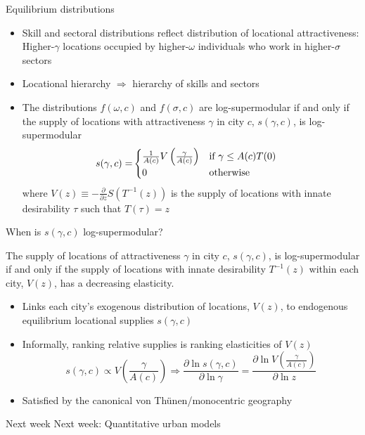\documentclass[11pt,notes=hide,aspectratio=169]{beamer}
\begin{document}
\begin{frame}{Equilibrium distributions}
\begin{itemize}
\item Skill and sectoral distributions reflect distribution of locational
attractiveness: Higher-$\gamma$ locations occupied by higher-$\omega$
individuals who work in higher-$\sigma$ sectors
\item Locational hierarchy $\Rightarrow$ hierarchy of skills and sectors
\item The distributions $f(\omega,c)$ and $f(\sigma,c)$ are log-supermodular
if and only if the supply of locations with attractiveness $\gamma$
in city $c$, $s(\gamma,c)$, is log-supermodular 
\begin{align*}
s(\gamma,c)= & \begin{cases}
\frac{1}{A(c)}V\left(\frac{\gamma}{A(c)}\right) & \textnormal{if }\gamma\leq A(c)T(0)\\
0 & \textnormal{otherwise}
\end{cases}
\end{align*}
where\textrm{ $V(z)\equiv-\frac{\partial}{\partial z}S\left(T^{-1}(z)\right)$
is }the supply of locations with innate desirability $\tau$ such
that $T(\tau)=z$
\end{itemize}
\end{frame}
\begin{frame}{When is $s(\gamma,c)$ log-supermodular?}
\begin{proposition}
\label{prop:LocationDistribution}The supply of locations of attractiveness
$\gamma$ in city $c$, $s(\gamma,c)$, is log-supermodular if and
only if the supply of locations with innate desirability \textrm{\textup{$T^{-1}(z)$}}
within each city, $V(z)$, has a decreasing elasticity.\end{proposition}
\begin{itemize}
\item Links each city's exogenous distribution of locations, $V(z)$, to
endogenous equilibrium locational supplies $s(\gamma,c)$
\item Informally, ranking relative supplies is ranking elasticities of $V(z)$
\[
s(\gamma,c)\propto V\left(\frac{\gamma}{A(c)}\right)\Rightarrow\frac{\partial\ln s(\gamma,c)}{\partial\ln\gamma}=\frac{\partial\ln V\left(\frac{\gamma}{A(c)}\right)}{\partial\ln z}
\]
\item Satisfied by the canonical von Th\"{u}nen/monocentric geography
\end{itemize}
\end{frame}
\begin{frame}{Next week}
Next week: Quantitative urban models
\end{frame}
\end{document}
